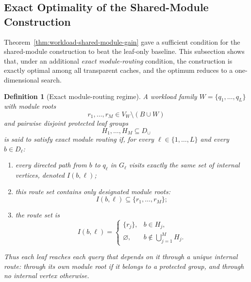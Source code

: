 \documentclass[journal]{IEEEtran}
\newtheorem{definition}{Definition}[section]
\numberwithin{equation}{section}
\begin{document}
\subsection{Exact Optimality of the Shared-Module Construction}
\label{subsec:shared-module-optimality}

Theorem~\ref{thm:workload-shared-module-gain} gave a sufficient condition for
the shared-module construction to beat the leaf-only baseline.  This
subsection shows that, under an additional \emph{exact module-routing}
condition, the construction is exactly optimal among all transparent caches,
and the optimum reduces to a one-dimensional search.

\begin{definition}[Exact module-routing regime]
\label{def:no-spurious-interception}
A workload family \(W=\{q_1,\ldots,q_L\}\) with module roots
\[
  r_{1},\ldots,r_{M}\in V_W\setminus(B\cup W)
\]
and pairwise disjoint protected leaf groups
\[
  H_{1},\ldots,H_{M}\subseteq D_{\cup}
\]
is said to satisfy \emph{exact module routing} if, for every
\(\ell\in\{1,\ldots,L\}\) and every \(b\in D_\ell\):
\begin{enumerate}[label=\textup{(\roman*)}]
\item every directed path from \(b\) to \(q_\ell\) in \(G_\ell\) visits
exactly the same set of internal vertices, denoted \(I(b,\ell)\);
\item this route set contains only designated module roots:
\begin{equation}
  I(b,\ell)\subseteq\{r_{1},\ldots,r_{M}\};
\label{eq:no-spurious}
\end{equation}
\item the route set is
\begin{equation}
  I(b,\ell)=
  \begin{cases}
    \{r_{j}\}, & b\in H_{j},\\[0.5mm]
    \varnothing, & b\notin\bigcup_{j=1}^{M}H_{j}.
  \end{cases}
\label{eq:exact-route-sets}
\end{equation}
\end{enumerate}
Thus each leaf reaches each query that depends on it through a unique
internal route: through its own module root if it belongs to a protected
group, and through no internal vertex otherwise.
\end{definition}
\end{document}
